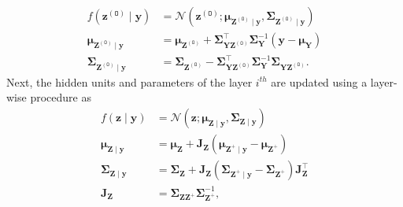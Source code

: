 \documentclass{article}
\begin{document}
\begin{equation*} \label{eq:z0update}
\begin{aligned}
f\left(\boldsymbol{z}^{(\mathtt{O})} \mid \boldsymbol{y}\right) &=\mathcal{N}\left(\boldsymbol{z}^{(\mathtt{O})} ; \boldsymbol{\mu}_{\boldsymbol{Z}^{(\mathtt{O})} \mid \boldsymbol{y}}, \boldsymbol{\Sigma}_{\boldsymbol{Z}^{(\mathtt{O})} \mid \boldsymbol{y}}\right) \\
\boldsymbol{\mu}_{\boldsymbol{Z}^{(\mathtt{O})} \mid \boldsymbol{y}} &=\boldsymbol{\mu}_{\boldsymbol{Z}^{(\mathtt{O})}}+\boldsymbol{\Sigma}_{\boldsymbol{Y} \boldsymbol{Z}^{(\mathtt{O})}}^{\top} \boldsymbol{\Sigma}_{\boldsymbol{Y}}^{-1}\left(\boldsymbol{y}-\boldsymbol{\mu}_{\boldsymbol{Y}}\right) \\
\boldsymbol{\Sigma}_{\boldsymbol{Z}^{(\mathtt{O})} \mid \boldsymbol{y}} &=\boldsymbol{\Sigma}_{\boldsymbol{Z}^{(\mathtt{O})}}-\boldsymbol{\Sigma}_{\boldsymbol{Y} \boldsymbol{Z}^{(\mathtt{O})}}^{\top} \boldsymbol{\Sigma}_{\boldsymbol{Y}}^{-1} \boldsymbol{\Sigma}_{\boldsymbol{Y Z}^{(\mathtt{O})}}.
\end{aligned}
\end{equation*}
%
Next, the hidden units and parameters of the layer $i^{th}$ are updated using a layer-wise procedure as
\begin{equation*}  \label{eq:layerwiseupdate}
\begin{aligned}
f(\boldsymbol{z} \mid \boldsymbol{y}) &=\mathcal{N}\left(\boldsymbol{z} ; \boldsymbol{\mu}_{\boldsymbol{Z} \mid \boldsymbol{y}}, \boldsymbol{\Sigma}_{\boldsymbol{Z} \mid \boldsymbol{y}}\right) \\
\boldsymbol{\mu}_{\boldsymbol{Z} \mid \boldsymbol{y}} &=\boldsymbol{\mu}_{\boldsymbol{Z}}+\mathbf{J}_{\boldsymbol{Z}}\left(\boldsymbol{\mu}_{\boldsymbol{Z}^{+} \mid \boldsymbol{y}}-\boldsymbol{\mu}_{\boldsymbol{Z}^{+}}\right) \\
\boldsymbol{\Sigma}_{\boldsymbol{Z} \mid \boldsymbol{y}} &=\boldsymbol{\Sigma}_{\boldsymbol{Z}}+\mathbf{J}_{\boldsymbol{Z}}\left(\boldsymbol{\Sigma}_{\boldsymbol{Z}^{+} \mid \boldsymbol{y}}-\boldsymbol{\Sigma}_{\boldsymbol{Z}^{+}}\right) \mathbf{J}_{\boldsymbol{Z}}^{\top} \\
\mathbf{J}_{\boldsymbol{Z}} &=\boldsymbol{\Sigma}_{\boldsymbol{Z Z}^{+}} \boldsymbol{\Sigma}_{\boldsymbol{Z}^{+}}^{-1},
\end{aligned}
\end{equation*}
%
\end{document}
